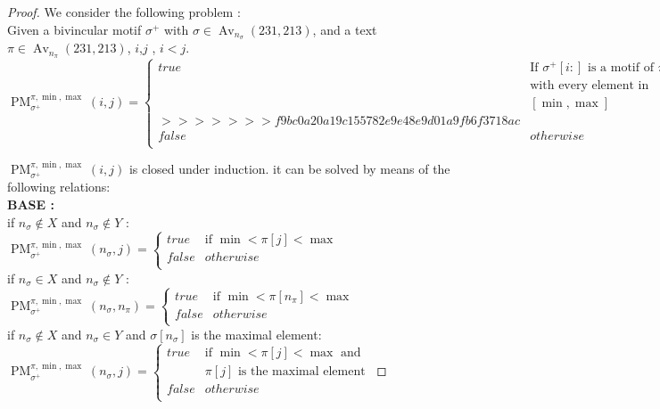 \documentclass[a4paper]{llncs}
\DeclareMathOperator{\Avd}{Av}
\newcommand\Av[2]{\Avd_{{#1}}({#2})}
\newcommand{\ptext}{\pi}
\newcommand{\pmotif}{\sigma}
\newcommand{\x}{X}
\newcommand{\y}{Y}
\newcommand{\pbmotif}{\pmotif^+}
\DeclareMathOperator{\PMa}{PM}
\newcommand{\PM}[6]{\PMa_{{#1}}^{{#2},{#3},{#4}}({#5},{#6})}
\begin{document}
\begin{proof}
We consider the following problem :\\
Given a bivincular motif $\pbmotif$ with $\pmotif \in \Av{n_\pmotif}{231,213} $, and a text $\ptext \in \Av{n_\ptext}{231,213}$, $i$,$j$ , $i<j$.\\

$
\PM{\pbmotif}{\ptext}{\min}{\max}{i}{j}=
\begin{cases}
	true 	& \text{If $\pbmotif[i:]$ is a motif of $\ptext[j:]$}\\
			& \text{with every element in}\\
			&[\min,\max]\\
>>>>>>> f9bc0a20a19c155782e9e48e9d01a9fb6f3718ac

			&\\

	false 	& otherwise\\
\end{cases}
$

$\PM{\pbmotif}{\ptext}{\min}{\max}{i}{j}$ is closed under induction.
it can be solved by means of the following relations:\\

\textbf{BASE :} \\
if $n_\pmotif \notin  \x $ and $n_\pmotif \notin  \y$ : \\
$
\PM{\pbmotif}{\ptext}{\min}{\max}{n_\pmotif}{j} =
\begin{cases}
	true 	& \text{if $\min<\ptext[j]<\max$}\\
	false 	& otherwise\\
\end{cases}
$
\\

if $n_\pmotif \in  \x $ and $n_\pmotif \notin  \y$ : \\
$
\PM{\pbmotif}{\ptext}{\min}{\max}{n_\pmotif}{n_\ptext} =
\begin{cases}
	true 	& \text{if $\min<\ptext[n_\ptext]<\max$}\\
	false 	& otherwise\\
\end{cases}
$
\\

if $n_\pmotif \notin  \x$  and $n_\pmotif \in  \y$ and $\pmotif[n_\pmotif]$ is the maximal element: \\
$
\PM{\pbmotif}{\ptext}{\min}{\max}{n_\pmotif}{j}=
\begin{cases}
	true 	& \text{if $\min<\ptext[j]<\max$ and }\\
			&\text{$\ptext[j]$ is the maximal element}\\
	false 	& otherwise\\
\end{cases}
$


\end{proof}
\end{document}
